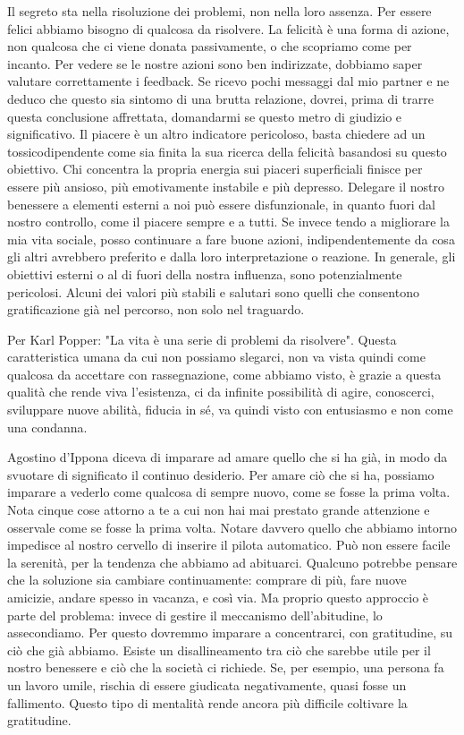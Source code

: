 \documentclass[12pt]{book} %
\begin{document}
Il segreto sta nella risoluzione dei problemi, non nella loro assenza. Per essere felici abbiamo bisogno di qualcosa da
risolvere. La felicità è una forma di azione, non qualcosa che ci viene donata passivamente, o che scopriamo come per
incanto. Per vedere se le nostre azioni sono ben indirizzate, dobbiamo saper valutare correttamente i feedback. Se
ricevo pochi messaggi dal mio partner e ne deduco che questo sia sintomo di una brutta relazione, dovrei, prima di
trarre questa conclusione affrettata, domandarmi se questo metro di giudizio e significativo. Il piacere è un altro
indicatore pericoloso, basta chiedere ad un tossicodipendente come sia finita la sua ricerca della felicità basandosi
su questo obiettivo. Chi concentra la propria energia sui piaceri superficiali finisce per
essere più ansioso, più emotivamente instabile e più depresso. Delegare il nostro benessere a elementi esterni a noi può essere disfunzionale, in quanto fuori dal nostro controllo, come il piacere sempre e a tutti. Se invece tendo a migliorare la mia vita sociale, posso continuare a fare buone azioni,
indipendentemente da cosa gli altri avrebbero preferito e dalla loro interpretazione o reazione. In generale, gli
obiettivi esterni o al di fuori della nostra influenza, sono potenzialmente pericolosi. Alcuni dei valori più stabili e salutari sono quelli che consentono gratificazione già nel percorso, non solo nel traguardo.

Per Karl Popper: "La vita è una serie di problemi da risolvere". Questa
caratteristica umana da cui non possiamo slegarci, non va vista quindi come qualcosa da accettare con rassegnazione,
come abbiamo visto, è grazie a questa qualità che rende viva l'esistenza, ci da infinite
possibilità di agire, conoscerci, sviluppare nuove abilità, fiducia in sé, va quindi visto con entusiasmo e non come
una condanna.

Agostino d'Ippona diceva di imparare ad amare quello che si ha già, in modo da svuotare di significato il continuo
desiderio. Per amare ciò che si ha, possiamo imparare a vederlo come qualcosa di sempre nuovo, come se fosse la prima volta. Nota cinque cose attorno a te a cui non hai mai prestato grande attenzione e osservale come se fosse la prima
volta. Notare davvero quello che abbiamo intorno impedisce al nostro cervello di inserire il pilota automatico.
Può non essere facile la serenità, per la tendenza che abbiamo ad abituarci. Qualcuno potrebbe pensare che la soluzione sia cambiare continuamente: comprare di più, fare nuove amicizie, andare spesso in vacanza, e così via. Ma proprio questo approccio è parte del problema: invece di gestire il meccanismo dell'abitudine, lo assecondiamo. Per questo dovremmo imparare a concentrarci, con gratitudine, su ciò che già abbiamo.
Esiste un disallineamento tra ciò che sarebbe utile per il nostro benessere e ciò che la società ci richiede. Se, per esempio, una persona fa un lavoro umile, rischia di essere giudicata negativamente, quasi fosse un fallimento. Questo tipo di mentalità rende ancora più difficile coltivare la gratitudine.
\end{document}
